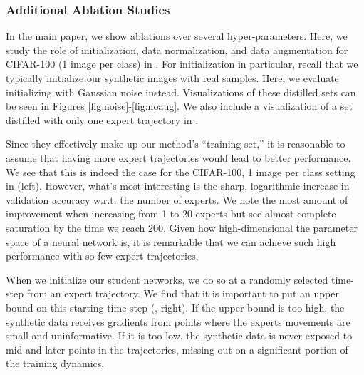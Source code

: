 

\subsubsection{Additional Ablation Studies}


In the main paper, we show ablations over several hyper-parameters. Here, we study the role of initialization, data normalization, and data augmentation for CIFAR-100 (1 image per class) in . For initialization in particular, recall that we typically initialize our synthetic images with real samples. Here, we evaluate initializing with Gaussian noise instead. Visualizations of these distilled sets can be seen in Figures \ref{fig:noise}-\ref{fig:noaug}. We also include a visualization of a set distilled with only one expert trajectory in .





Since they effectively make up our method's ``training set,'' it is reasonable to assume that having more expert trajectories would lead to better performance. We see that this is indeed the case for the CIFAR-100, 1 image per class setting in  (left). However, what's most interesting is the sharp, logarithmic increase in validation accuracy w.r.t. the number of experts. We note the most amount of improvement when increasing from  1 to 20 experts but see almost complete saturation by the time we reach 200. Given how high-dimensional the parameter space of a neural network is, it is remarkable that we can achieve such high performance with so few expert trajectories. \vspace{10pt}

When we initialize our student networks, we do so at a randomly selected time-step from an expert trajectory. We find that it is important to put an upper bound on this starting time-step (, right). If the upper bound is too high, the synthetic data receives gradients from points where the experts movements are small and uninformative. If it is too low, the synthetic data is never exposed to mid and later points in the trajectories, missing out on a significant portion of the training dynamics.


